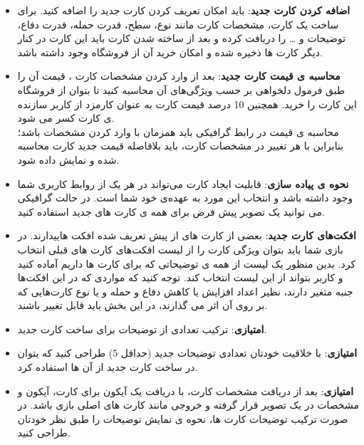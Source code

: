 \documentclass[]{article}
\begin{document}
\begin{itemize}
    \item \textbf{اضافه کردن کارت جدید}: باید امکان تعریف کردن کارت جدید را اضافه کنید. برای ساخت یک کارت، مشخصات کارت مانند نوع، سطح، قدرت حمله، قدرت دفاع، توضیحات و … را دریافت کرده و بعد از ساخته شدن کارت باید این کارت در کنار دیگر کارت ها ذخیره شده و امکان خرید آن از فروشگاه وجود داشته باشد.
    \item \textbf{محاسبه ی قیمت کارت جدید}: بعد از وارد کردن مشخصات کارت ، قیمت آن را طبق فرمول دلخواهی بر حسب ویژگی‌های آن محاسبه کنید تا بتوان از فروشگاه این کارت را خرید. همچنین 10 درصد قیمت کارت به عنوان کارمزد از کاربر سازنده ی کارت کسر می شود. \\
    محاسبه ی قیمت در رابط گرافیکی باید همزمان با وارد کردن مشخصات باشد؛ بنابراین با هر تغییر در مشخصات کارت، باید بلافاصله قیمت جدید کارت محاسبه شده و نمایش داده شود.
    \item \textbf{نحوه ی پیاده سازی}: قابلیت ایجاد کارت می‌تواند در هر یک از روابط کاربری شما وجود داشته باشد و انتخاب این مورد به عهده‌ی خود شما است. در حالت گرافیکی می توانید یک تصویر پیش فرض برای همه ی کارت های جدید استفاده کنید. 
    \item \textbf{افکت‌های کارت جدید}: 
    بعضی از کارت های از پیش تعریف شده افکت ‌هاییدارند. در بازی شما باید بتوان ویژگی کارت را از لیست افکت‌های کارت های قبلی انتخاب کرد. بدین منظور یک لیست از همه ی توضیحاتی که برای کارت ها داریم آماده کنید و کاربر بتواند از این لیست انتخاب کند. توجه کنید که مواردی که در این افکت‌ها جنبه متغیر دارند، نظیر اعداد افزایش یا کاهش دفاع و حمله و یا نوع کارت‌هایی که بر روی آن اثر می گذارند، در این بخش باید قابل تغییر باشند.
    
    \item \textbf{امتیازی}: ترکیب تعدادی از توضیحات برای ساخت کارت جدید.
    \item \textbf{امتیازی}: با خلاقیت خودتان تعدادی توضیحات جدید (حداقل 5) طراحی کنید که بتوان در ساخت کارت جدید از آن ها استفاده کرد.
    \item \textbf{امتیازی}:
     بعد از دریافت مشخصات کارت، با دریافت یک آیکون برای کارت، آیکون و مشخصات در یک تصویر قرار گرفته و خروجی مانند کارت های اصلی بازی باشد. در صورت ترکیب توضیحات کارت ها، نحوه ی نمایش توضیحات را طبق نظر خودتان طراحی کنید.
\end{itemize}
\end{document}
